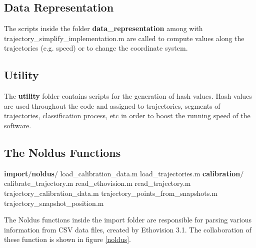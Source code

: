 \documentclass[12pt,titlepage]{article}
\newcommand\tab[1][1cm]{\hspace*{#1}}
\begin{document}
\begin{doublespace}
\subsection{Data Representation}
The scripts inside the folder \textbf{data\_representation} among with trajectory\_simplify\_implementation.m are called to compute values along the trajectories (e.g. speed) or to change the coordinate system.

\subsection{Utility}
The \textbf{utility} folder contains scripts for the generation of hash values. Hash values are used throughout the code and assigned to trajectories, segments of trajectories, classification process, etc in order to boost the running speed of the software.

\subsection{The Noldus Functions}

\textbf{import$/$noldus$/$}\linebreak
\tab load\_calibration\_data.m\linebreak
\tab load\_trajectories.m\linebreak
\textbf{\tab calibration$/$}\linebreak
\tab\tab calibrate\_trajectory.m\linebreak
\tab\tab read\_ethovision.m\linebreak
\tab\tab read\_trajectory.m\linebreak
\tab\tab trajectory\_calibration\_data.m\linebreak
\tab\tab trajectory\_points\_from\_snapshots.m\linebreak
\tab\tab trajectory\_snapshot\_position.m\linebreak

The Noldus functions inside the import folder are responsible for parsing various information from CSV data files, created by Ethovision 3.1. The collaboration of these function is shown in figure \ref{noldus}.


\end{doublespace}
\end{document}
